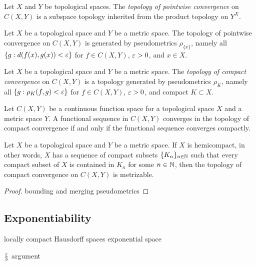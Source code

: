 \documentclass{../crs}
\begin{document}
\begin{defn}
Let $X$ and $Y$ be topological spaces.
The \emph{topology of pointwise convergence} on $C(X,Y)$ is a subspace topology inherited from the product topology on $Y^X$.
\end{defn}

\begin{prop}
Let $X$ be a topological space and $Y$ be a metric space.
The topology of pointwise convergence on $C(X,Y)$ is generated by pseudometrics $\rho_{\{x\}}$, namely all $\{g:d(f(x),g(x))<\varepsilon\}$ for $f\in C(X,Y)$, $\varepsilon>0$, and $x\in X$.
\end{prop}

\begin{defn}
Let $X$ be a topological space and $Y$ be a metric space.
The \emph{topology of compact convergence} on $C(X,Y)$ is a topology generated by pseudometrics $\rho_K$, namely all $\{g:\rho_K(f,g)<\varepsilon\}$ for $f\in C(X,Y)$, $\varepsilon>0$, and compact $K\subset X$.
\end{defn}

\begin{prop}
Let $C(X,Y)$ be a continuous function space for a topological space $X$ and a metric space $Y$.
A functional sequence in $C(X,Y)$ converges in the topology of compact convergence if and only if the functional sequence converges compactly.
\end{prop}

\begin{thm}
Let $X$ be a topological space and $Y$ be a metric space.
If $X$ is hemicompact, in other words, $X$ has a sequence of compact subsets $\{K_n\}_{n\in\mathbb{N}}$ such that every compact subset of $X$ is contained in $K_n$ for some $n\in\mathbb{N}$, then the topology of compact convergence on $C(X,Y)$ is metrizable.
\end{thm}

\begin{proof}
bounding and merging pseudometrics
\end{proof}



\subsection{Exponentiability}
locally compact Hausdorff spaces
exponential space






$\frac{\varepsilon}3$ argument
\end{document}
